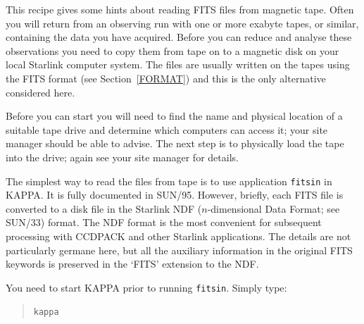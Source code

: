 \documentclass[twoside,11pt]{article}
\newcommand{\xref}[3]{#1}
\begin{document}
This recipe gives some hints about reading FITS files from magnetic tape.
Often you will return from an observing run with one or more exabyte
tapes, or similar, containing the data you have acquired.  Before you
can reduce and analyse these observations you need to copy them from
tape on to a magnetic disk on your local Starlink computer system.
The files are usually written on the tapes using the FITS format (see
Section~\ref{FORMAT}) and this is the only alternative considered here.

Before you can start you will need to find the name and physical location
of a suitable tape drive and determine which computers can access it;
your site manager should be able to advise.  The next step is to physically
load the tape into the drive; again see your site manager for details.

The simplest way to read the files from tape is to use application
\xref{{\tt fitsin}}{sun95}{FITSIN} in KAPPA.  It is fully documented in
\xref{SUN/95}{sun95}{}\/\cite{SUN95}.  However, briefly, each FITS
file is converted to a disk file in the Starlink NDF ($n$-dimensional
Data Format; see \xref{SUN/33}{sun33}{}\cite{SUN33}) format.  The NDF
format is the most convenient for subsequent processing with CCDPACK and
other Starlink applications.  The details are not particularly germane
here, but all the auxiliary information in the original FITS keywords
is preserved in the `FITS' extension to the NDF.

You need to start KAPPA prior to running {\tt fitsin}.  Simply type:

\begin{quote}
{\tt kappa}
\end{quote}
\end{document}
